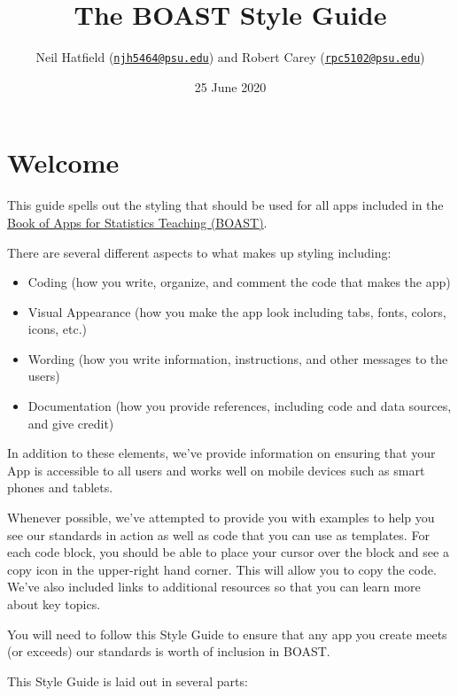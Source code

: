 \documentclass[
]{book}
\title{The BOAST Style Guide}
\author{Neil Hatfield (\href{mailto:njh5464@psu.edu}{\nolinkurl{njh5464@psu.edu}}) and Robert Carey (\href{mailto:rpc5102@psu.edu}{\nolinkurl{rpc5102@psu.edu}})}
\date{25 June 2020}
\providecommand{\tightlist}{%
  \setlength{\itemsep}{0pt}\setlength{\parskip}{0pt}}
\begin{document}
\maketitle

{
\setcounter{tocdepth}{1}
\tableofcontents
}
\hypertarget{welcome}{%
\chapter*{Welcome}\label{welcome}}

This guide spells out the styling that should be used for all apps included in the \href{https://github.com/EducationShinyAppTeam/BOAST}{Book of Apps for Statistics Teaching (BOAST)}.

There are several different aspects to what makes up styling including:

\begin{itemize}
\tightlist
\item
  Coding (how you write, organize, and comment the code that makes the app)
\item
  Visual Appearance (how you make the app look including tabs, fonts, colors, icons, etc.)
\item
  Wording (how you write information, instructions, and other messages to the users)
\item
  Documentation (how you provide references, including code and data sources, and give credit)
\end{itemize}

In addition to these elements, we've provide information on ensuring that your App is accessible to all users and works well on mobile devices such as smart phones and tablets.

Whenever possible, we've attempted to provide you with examples to help you see our standards in action as well as code that you can use as templates. For each code block, you should be able to place your cursor over the block and see a copy icon in the upper-right hand corner. This will allow you to copy the code. We've also included links to additional resources so that you can learn more about key topics.

You will need to follow this Style Guide to ensure that any app you create meets (or exceeds) our standards is worth of inclusion in BOAST.

This Style Guide is laid out in several parts:
\end{document}
